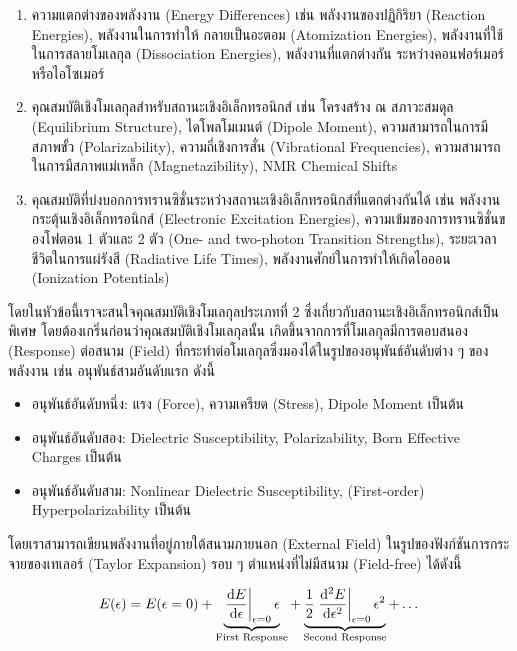 \begin{enumerate}[topsep=0pt]
    \item ความแตกต่างของพลังงาน (Energy Differences) เช่น พลังงานของปฏิกิริยา (Reaction Energies), พลังงานในการทำให้%
    กลายเป็นอะตอม (Atomization Energies), พลังงานที่ใช้ในการสลายโมเลกุล (Dissociation Energies), พลังงานที่แตกต่างกัน%
    ระหว่างคอนฟอร์เมอร์หรือไอโซเมอร์

    \item คุณสมบัติเชิงโมเลกุลสำหรับสถานะเชิงอิเล็กทรอนิกส์ เช่น โครงสร้าง ณ สภาวะสมดุล (Equilibrium Structure), ไดโพลโมเมนต์ 
    (Dipole Moment), ความสามารถในการมีสภาพขั้ว (Polarizability), ความถี่เชิงการสั่น (Vibrational Frequencies), 
    ความสามารถในการมีสภาพแม่เหล็ก (Magnetazibility), NMR Chemical Shifts

    \item คุณสมบัติที่บ่งบอกการทรานซิชั่นระหว่างสถานะเชิงอิเล็กทรอนิกส์ที่แตกต่างกันได้ เช่น พลังงานกระตุ้นเชิงอิเล็กทรอนิกส์ (Electronic 
    Excitation Energies), ความเข้มของการทรานซิชั่นของโฟตอน 1 ตัวและ 2 ตัว (One- and two-photon Transition Strengths), 
    ระยะเวลาชีวิตในการแผ่รังสี (Radiative Life Times), พลังงานศักย์ในการทำให้เกิดไอออน (Ionization Potentials) 
\end{enumerate}

โดยในหัวข้อนี้เราจะสนใจคุณสมบัติเชิงโมเลกุลประเภทที่ 2 ซึ่งเกี่ยวกับสถานะเชิงอิเล็กทรอนิกส์เป็นพิเศษ โดยต้องเกริ่นก่อนว่าคุณสมบัติเชิงโมเลกุลนั้น%
เกิดขึ้นจากการที่โมเลกุลมีการตอบสนอง (Response) ต่อสนาม (Field) ที่กระทำต่อโมเลกุลซึ่งมองได้ในรูปของอนุพันธ์อันดับต่าง ๆ ของพลังงาน 
เช่น อนุพันธ์สามอันดับแรก ดังนี้

\begin{itemize}[topsep=0pt]
    \item อนุพันธ์อันดับหนึ่ง: แรง (Force), ความเครียด (Stress), Dipole Moment เป็นต้น
    \item อนุพันธ์อันดับสอง: Dielectric Susceptibility, Polarizability, Born Effective Charges เป็นต้น
    \item อนุพันธ์อันดับสาม: Nonlinear Dielectric Susceptibility, (First-order) Hyperpolarizability เป็นต้น  
\end{itemize}

โดยเราสามารถเขียนพลังงานที่อยู่ภายใต้สนามภายนอก (External Field) ในรูปของฟังก์ชันการกระจายของเทเลอร์ (Taylor Expansion) 
รอบ ๆ ตำแหน่งที่ไม่มีสนาม (Field-free) ได้ดังนี้

\begin{equation}\label{eq:ener_taylor}
    E(\epsilon) = E(\epsilon = 0) 
    + \underbrace{\evaluated{\dv{E}{\epsilon}}_{\epsilon = 0} \epsilon}_{%
    \text{First Response}}
    + \underbrace{\frac{1}{2} \evaluated{\dv[2]{E}{\epsilon}}_{\epsilon = 0} \epsilon^{2}}_{%
    \text{Second Response}}
    + \dots
\end{equation}

